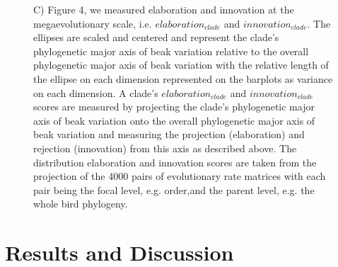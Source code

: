 \documentclass[12pt,letterpaper]{article}
\begin{document}
\begin{figure}[!htbp]
{{C) Figure 4, we measured elaboration and innovation at the megaevolutionary scale, i.e. $elaboration_{clade}$ and $innovation_{clade}$.
The ellipses are scaled and centered and represent the clade's phylogenetic major axis of beak variation relative to the overall phylogenetic major axis of beak variation with the relative length of the ellipse on each dimension represented on the barplots as variance on each dimension.
A clade's $elaboration_{clade}$ and $innovation_{clade}$ scores are measured by projecting the clade's phylogenetic major axis of beak variation onto the overall phylogenetic major axis of beak variation and measuring the projection (elaboration) and rejection (innovation) from this axis as described above.
The distribution elaboration and innovation scores are taken from the projection of the 4000 pairs of evolutionary rate matrices with each pair being the focal level, e.g. order,and the parent level, e.g. the whole bird phylogeny.}}
\label{Fig:cheatsheet}
\end{figure}
\bigskip



\section{Results and Discussion}
\end{document}
